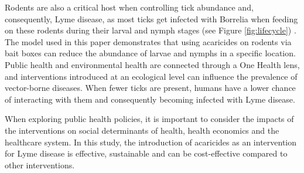 \documentclass[12pt, centerh1]{article}
\begin{document}
Rodents are also a critical host when controlling tick abundance and, consequently, Lyme disease, as most ticks get infected with Borrelia when feeding on these rodents during their larval and nymph stages (see Figure \ref{fig:lifecycle}) \citep{radolf2012ticks}. The model used in this paper demonstrates that using acaricides on rodents via bait boxes can reduce the abundance of larvae and nymphs in a specific location. Public health and environmental health are connected through a One Health lens, and interventions introduced at an ecological level can influence the prevalence of vector-borne diseases. When fewer ticks are present, humans have a lower chance of interacting with them and consequently becoming infected with Lyme disease. 

When exploring public health policies, it is important to consider the impacts of the interventions on social determinants of health, health economics and the healthcare system. In this study, the introduction of acaricides as an intervention for Lyme disease is effective, sustainable and can be cost-effective compared to other interventions. 

\begin{table}[]
\centering
\caption{Comparison of acaricides against other Lyme disease interventions. }
\label{tab:my-table}
\end{table}
\end{document}
